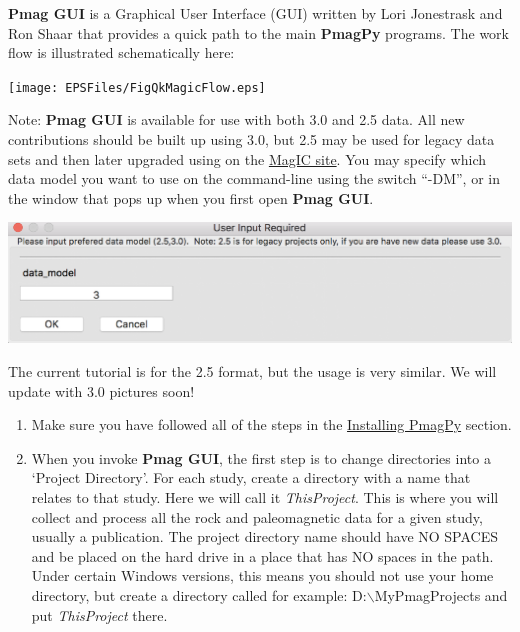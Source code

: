 \documentclass[11pt]{book}
\begin{document}
{{\bf Pmag GUI} is a Graphical User Interface (GUI) written by Lori Jonestrask and Ron Shaar  that provides a quick path to the main {\bf PmagPy} programs. The work flow is illustrated schematically here:

\texttt{[image: EPSFiles/FigQkMagicFlow.eps]}

Note: {\bf Pmag GUI} is available for use with both 3.0 and 2.5 data.  All new contributions should be built up using 3.0, but 2.5 may be used for legacy data sets and then later upgraded using on the \href{https://beta.earthref.org/MagIC/upgrade}{MagIC site}.  You may specify which data model you want to use on the command-line using the switch ``-DM'', or in the window that pops up when you first open {\bf Pmag GUI}.

\includegraphics[width=15cm]{EPSFiles/PmagGUI_choose_data_model.eps}

The current tutorial is for the 2.5 format, but the usage is very similar.  We will update with 3.0 pictures soon!

\begin{enumerate}
\item Make sure you have followed all of the steps in the \href{#quick_start}{Installing PmagPy} section.


\item  When you invoke {\bf Pmag GUI}, the first step is to change directories into a  `Project Directory'. For each study, create a directory with a name that relates to that study. Here we will call it {\it ThisProject}.  This is where you will collect and process all the rock and paleomagnetic data for a given study, usually a publication. The project directory name should have NO SPACES and be placed on the hard drive in a place that has NO spaces in the path. Under certain Windows versions, this means you should not use your home directory, but create a directory called for example: D:$\backslash$MyPmagProjects and put {\it ThisProject} there.
%
%
%



\end{enumerate}}
\end{document}
